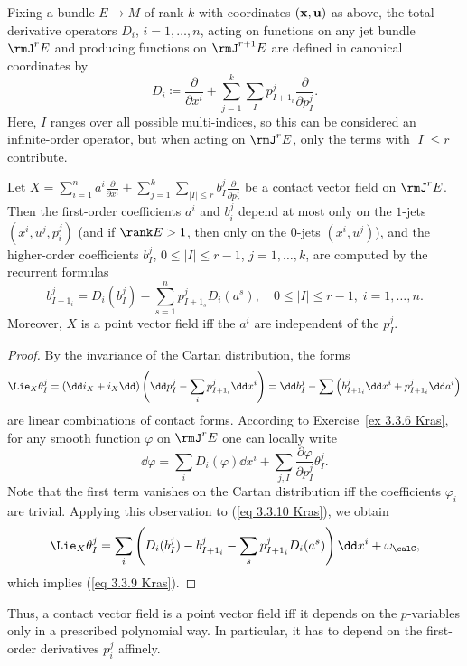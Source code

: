 \begin{defn}
    Fixing a bundle $E\to M$ of rank $k$ with coordinates $(\bf{x},\bf{u})$ as above, the total derivative operators $D_i$, $i=1,\ldots,n$, acting on functions on any jet bundle $\rmJ^rE$ and producing functions on $\rmJ^{r+1}E$ are defined in canonical coordinates by 
    \[D_i \coloneqq \frac{\partial}{\partial x^i}+\sum_{j=1}^k\sum_{I}p_{I+1_i}^j\frac{\partial}{\partial p^j_I}.\label{eq def total derivative}\]
    Here, $I$ ranges over all possible multi-indices, so this can be considered an infinite-order operator, but when acting on $\rmJ^r E$, only the terms with $|I|\leq r$ contribute.
\end{defn}

\begin{thm}\label{thm 3.3.4 Kras}
     Let $X=\sum_{i=1}^n a^i \frac{\partial}{\partial x^i}+\sum_{j=1}^k \sum_{|I|\leq r}b^j_I \frac{\partial}{\partial p^j_I}$ be a contact vector field on $\rmJ^r E$. Then the first-order coefficients $a^i$ and $b^j_i$ depend at most only on the $1$-jets $(x^i,u^j,p^j_i)$ (and if $\rank E>1$, then only on the $0$-jets $(x^i,u^j)$), and the higher-order coefficients $b^j_I$, $0\leq |I|\leq r-1$, $j=1,\ldots,k$, are computed by the recurrent formulas 
     \[b^j_{I+1_i}=D_i(b^j_I)-\sum_{s=1}^n p^j_{I+1_s}D_i(a^s),\quad 0\leq |I|\leq r-1,\; i=1,\ldots,n. \label{eq 3.3.9 Kras}\]
    Moreover, $X$ is a point vector field iff the $a^i$ are independent of the $p^j_I$.
\end{thm}
\begin{proof}
    By the invariance of the Cartan distribution, the forms 
    \[\Lie_X \theta^j_I=(\dd i_X+i_X\dd)\left(\dd p^j_I-\sum_i p^j_{I+1_i}\dd x^i\right)=\dd b^j_I-\sum\left(b^j_{I+1_i}\dd x^i+p^j_{I+1_i}\dd a^i\right)\label{eq 3.3.10 Kras}\]
    are linear combinations of contact forms.  According to Exercise~\ref{ex 3.3.6 Kras}, for any smooth function $\varphi$ on $\rmJ^rE$ one can locally write 
    \[\dd \varphi=\sum_i D_i(\varphi)\dd x^i+\sum_{j,I}\frac{\partial\varphi}{\partial p^j_I}\theta^j_I.\]
    Note that the first term vanishes on the Cartan distribution iff the coefficients $\varphi_i$ are trivial. Applying this observation to (\ref{eq 3.3.10 Kras}), we obtain 
    \[\Lie_X \theta^j_I=\sum_i \left(D_i(b^j_I)-b^j_{I+1_i}-\sum_s p^j_{I+1_i}D_i(a^s)\right)\dd x^i+\omega_\calC,\]
    which implies (\ref{eq 3.3.9 Kras}).
\end{proof}

Thus, a contact vector field is a point vector field iff it depends on the $p$-variables only in a prescribed polynomial way. In particular, it has to depend on the first-order derivatives $p^j_i$ affinely.

